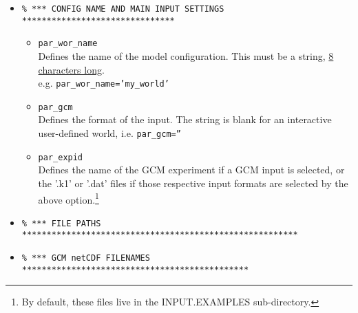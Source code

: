 \begin{itemize}

\vspace{2mm}
\item []
\small\vspace{-2pt}\begin{verbatim}
% *** CONFIG NAME AND MAIN INPUT SETTINGS *******************************
\end{verbatim}\vspace{-2pt}\normalsize

\begin{itemize}[noitemsep]

\vspace{1mm}
\item [] \texttt{par\_wor\_name}
\vspace{1mm}
\\Defines the name of the model configuration. This must be a string, \uline{8 characters long}.
\\e.g. \texttt{par\_wor\_name='my\_world'}

\vspace{1mm}
\item [] \texttt{par\_gcm}
\vspace{1mm}
\\Defines the format of the input. The string is blank for an interactive user-defined world, i.e. \texttt{par\_gcm=''}

\vspace{1mm}
\item [] \texttt{par\_expid}
\vspace{1mm}
\\Defines the name of the GCM experiment if a GCM input is selected, or the '\textsf{\small .k1}' or '\textsf{\small .dat}' files if those respective input formats are selected by the above option.\footnote{By default, these files live in the \textsf{\small INPUT.EXAMPLES} sub-directory.}

\end{itemize}

\vspace{2mm}
\item []
\small\vspace{-2pt}\begin{verbatim}
% *** FILE PATHS ********************************************************
\end{verbatim}\vspace{-2pt}\normalsize

\vspace{2mm}
\item []
\small\vspace{-2pt}\begin{verbatim}
% *** GCM netCDF FILENAMES **********************************************
\end{verbatim}\vspace{-2pt}\normalsize


\end{itemize}
